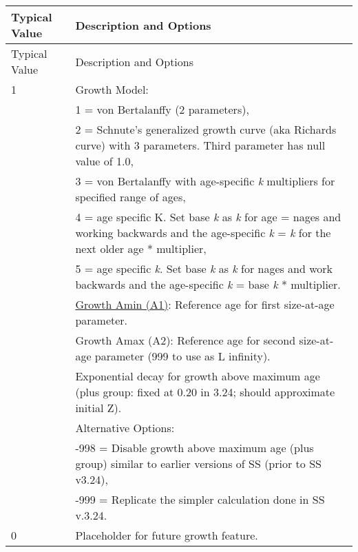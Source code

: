 	
\begin{longtable}{p{0.5cm} p{2cm} p{12cm}}
	\hline	
	\multicolumn{2}{l}{Typical Value} & Description and Options\Tstrut\Bstrut\\
	\hline
	\endfirsthead

	\hline
	\multicolumn{2}{l}{Typical Value} & Description and Options\Tstrut\Bstrut\\
	\hline
	\endhead
	\hline

	\endfoot
	
	\endlastfoot

	1 & & Growth Model: \Tstrut\\
	  & & 1 = von Bertalanffy (2 parameters),\\
	  & & 2 = Schnute's generalized growth curve (aka Richards curve) with 3 parameters.  Third parameter has null value of 1.0, \\
	  & & 3 = von Bertalanffy with age-specific \textit{k} multipliers for specified range of ages,\\
	  & & 4 = age specific K. Set base \textit{k} as \textit{k} for age = nages and working backwards and the age-specific \textit{k} = \textit{k} for the next older age * multiplier, \\
	  & & 5 = age specific \textit{k}. Set base \textit{k} as \textit{k} for nages and work backwards and the age-specific \textit{k} = base \textit{k} * multiplier.\Bstrut \\
	\hline

	\Tstrut 1.66 & & \hyperlink{A1}{Growth Amin (A1)}: Reference age for first size-at-age parameter.\Bstrut\\
	\hline

	\Tstrut 25 & & Growth Amax (A2): Reference age for second size-at-age parameter (999 to use as L infinity).\Bstrut\\
	\hline
	
	\Tstrut 0.20 & & Exponential decay for growth above maximum age (plus group: fixed at 0.20 in 3.24; should approximate initial Z).\\
			     & & Alternative Options: \\
			     & & -998 = Disable growth above maximum age (plus group) similar to earlier versions of SS (prior to SS v3.24),\\
			     & & -999 = Replicate the simpler calculation done in SS v.3.24.\Bstrut\\
	\hline
	
	0   & & Placeholder for future growth feature. \Tstrut\Bstrut\\
	\hline


\end{longtable}
